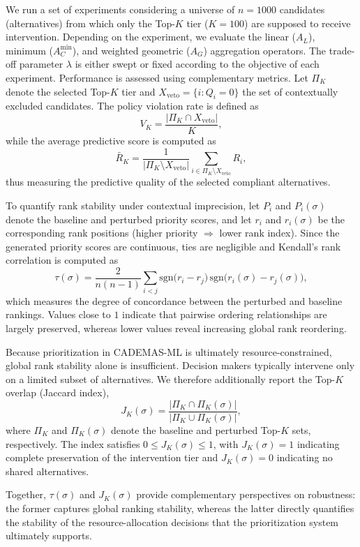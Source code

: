 \documentclass[mathematics,article,submit,moreauthors]{Definitions/mdpi}
\begin{document}
We run a set of experiments considering a universe of $n=1000$ candidates (alternatives) from which only the Top-$K$ tier ($K=100$) are supposed to receive intervention. Depending on the experiment, we evaluate the linear ($A_L$), minimum ($A_C^{\min}$), and weighted geometric ($A_G$) aggregation operators. The trade-off parameter $\lambda$ is either swept or fixed according to the objective of each experiment. Performance is assessed using complementary metrics. Let $\Pi_K$ denote the selected Top-$K$ tier and $X_{\mathrm{veto}}=\{i:Q_i=0\}$ the set of contextually excluded candidates. The policy violation rate is defined as
\begin{equation}
V_K=\frac{|\Pi_K\cap X_{\mathrm{veto}}|}{K},
\end{equation}
while the average predictive score is computed as
\begin{equation}
\bar{R}_K=\frac{1}{|\Pi_K\setminus X_{\mathrm{veto}}|}
\sum_{i\in \Pi_K\setminus X_{\mathrm{veto}}}R_i,
\end{equation}
thus measuring the predictive quality of the selected compliant alternatives. {\color{red}To quantify rank stability under contextual imprecision, let $P_i$ and
$P_i(\sigma)$ denote the baseline and perturbed priority scores, and let
$r_i$ and $r_i(\sigma)$ be the corresponding rank positions (higher
priority $\Rightarrow$ lower rank index). Since the generated priority
scores are continuous, ties are negligible and Kendall's rank
correlation is computed as
\begin{equation}
\tau(\sigma)=\frac{2}{n(n-1)}
\sum_{i<j}
\mathrm{sgn}\!\bigl(r_i-r_j\bigr)\,
\mathrm{sgn}\!\bigl(r_i(\sigma)-r_j(\sigma)\bigr),
\end{equation}
which measures the degree of concordance between the perturbed and
baseline rankings. Values close to $1$ indicate that pairwise ordering
relationships are largely preserved, whereas lower values reveal
increasing global rank reordering.

Because prioritization in CADEMAS-ML is ultimately resource-constrained,
global rank stability alone is insufficient. Decision makers typically
intervene only on a limited subset of alternatives. We therefore
additionally report the Top-$K$ overlap (Jaccard index),
\begin{equation}
J_K(\sigma)=
\frac{|\Pi_K\cap \Pi_K(\sigma)|}
     {|\Pi_K\cup \Pi_K(\sigma)|},
\end{equation}
where $\Pi_K$ and $\Pi_K(\sigma)$ denote the baseline and perturbed
Top-$K$ sets, respectively. The index satisfies
$0\le J_K(\sigma)\le1$, with $J_K(\sigma)=1$ indicating complete
preservation of the intervention tier and $J_K(\sigma)=0$ indicating no
shared alternatives.

Together, $\tau(\sigma)$ and $J_K(\sigma)$ provide complementary
perspectives on robustness: the former captures global ranking
stability, whereas the latter directly quantifies the stability of the
resource-allocation decisions that the prioritization system ultimately
supports.}
\end{document}
